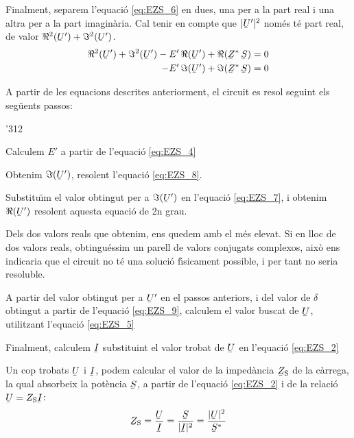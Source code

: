 Finalment, separem l'equaci\'{o} \eqref{eq:EZS_6} en dues, una per a la part real i una altra per a la part imagin\`{a}ria. Cal tenir en compte que $|\cmplx{U}'|^2$ nom\'{e}s t\'{e} part real, de valor $\Re^2(\cmplx{U}') + \Im^2(\cmplx{U}')$.
\begin{align}
   \Re^2(\cmplx{U}') + \Im^2(\cmplx{U}') - E' \, \Re(\cmplx{U}') + \Re(\cmplx{Z}^* \, \cmplx{S}) &= 0 \label{eq:EZS_7} \\
   - E' \, \Im(\cmplx{U}') + \Im(\cmplx{Z}^* \, \cmplx{S}) &= 0 \label{eq:EZS_8}
\end{align}

A partir de les equacions descrites anteriorment, el circuit es resol seguint els seg\"{u}ents passos:
\begin{dingautolist}{'312}
   \item Calculem $E'$ a partir de l'equaci\'{o} \eqref{eq:EZS_4}
   \item Obtenim $\Im(\cmplx{U}')$, resolent l'equaci\'{o} \eqref{eq:EZS_8}.
   \item Substitu\"{\i}m el valor obtingut per a $\Im(\cmplx{U}')$ en l'equaci\'{o} \eqref{eq:EZS_7}, i obtenim $\Re(\cmplx{U}')$ resolent aquesta equaci\'{o} de 2n grau.
   \item Dels dos valors reals que obtenim, ens quedem amb el m\'{e}s elevat. Si en lloc de dos valors reals, obtingu\'{e}ssim un parell de valors conjugats complexos, aix\`{o} ens indicaria que el circuit no t\'{e} una soluci\'{o} f\'{\i}sicament possible, i per tant no seria resoluble.
   \item A partir del valor  obtingut per a $\cmplx{U}'$ en el passos anteriors, i del valor de $\delta$ obtingut a partir de l'equaci\'{o} \eqref{eq:EZS_9}, calculem el valor buscat de $\cmplx{U}$, utilitzant l'equaci\'{o} \eqref{eq:EZS_5}
   \item Finalment, calculem $\cmplx{I}$ substituint el valor trobat de $\cmplx{U}$ en l'equaci\'{o} \eqref{eq:EZS_2}
\end{dingautolist}

Un cop trobats $\cmplx{U}$ i $\cmplx{I}$, podem calcular el valor de
la imped\`{a}ncia  $\cmplx{Z}\ped{S}$ de la c\`{a}rrega, la qual absorbeix
la pot\`{e}ncia $\cmplx{S}$, a partir de l'equaci\'{o} \eqref{eq:EZS_2} i de
la relaci\'{o} $\cmplx{U} = Z\ped{S} \cmplx{I}$:
\begin{equation}
   \cmplx{Z}\ped{S} = \frac{\cmplx{U}}{\cmplx{I}} =
   \frac{\cmplx{S}}{|\cmplx{I}|^2} =
   \frac{|\cmplx{U}|^2}{\cmplx{S}^*} \label{eq:EZS 10}
\end{equation}

